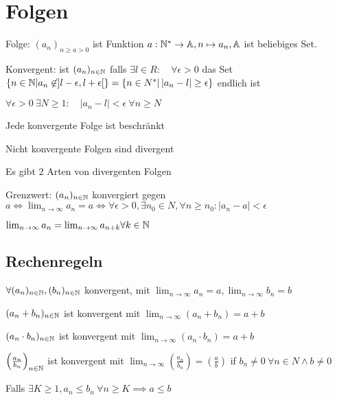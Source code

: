 
\section{Folgen}

\begin{compactdesc}
    \item[Folge:] $\left( a_n \right)_{n \ge a  > 0}$ ist Funktion $a:\mathbb{N}^* \to \mathbb{A}, n \mapsto a_n, \mathbb{A}$ ist beliebiges Set.
    \item[Konvergent:] ist $(a_n)_{n \in \mathbb{N}}$ falls $\exists l \in R: \quad \forall \epsilon > 0$ das Set $\left\{ n \in \mathbb{N} | a_n \not\in  ] l - \epsilon, l + \epsilon[ \right\} = \left\{ n \in N^* | \left| a_n - l \right| \ge \epsilon  \right\} $ endlich ist
        \begin{compactitem}
            \item $\forall  \epsilon > 0 \ \exists  N \ge 1: \quad |a_n - l| < \epsilon \ \forall n \ge N$
            \item Jede konvergente Folge ist beschränkt
            \item Nicht konvergente Folgen sind divergent
            \item Es gibt $2$ Arten von divergenten Folgen
        \end{compactitem}
    \item[Grenzwert:] $(a_n)_{n \in \mathbb{N}}$ konvergiert gegen $a \iff \lim_{n \to \infty} a_n = a \iff \forall \epsilon > 0, \exists n_0 \in N, \forall n \ge n_0: \left| a_n - a \right| < \epsilon$
        \begin{compactitem}
            \item $\lim_{n \to \infty} a_n = \lim_{n \to \infty} a_{n+k} \forall k \in \mathbb{N} $
        \end{compactitem}
\end{compactdesc}

\subsection{Rechenregeln}
$\forall (a_n)_{n \in \mathbb{N}}, (b_n)_{n \in \mathbb{N}}$ konvergent, mit $\lim_{n \to \infty} a_n = a, \lim_{n \to \infty} b_n = b$
\begin{compactenum}
    \item $(a_n + b_n)_{n \in \mathbb{N}}$ ist konvergent mit $\lim_{n \to \infty} (a_n + b_n) = a + b$
    \item $(a_n \cdot  b_n)_{n \in \mathbb{N}}$ ist konvergent mit $\lim_{n \to \infty} (a_n \cdot  b_n) = a + b$
    \item $\left( \frac{a_n}{b_n} \right) _{n \in \mathbb{N}}$ ist konvergent mit $\lim_{n \to \infty} \left( \frac{a_n}{b_n} \right) = \left( \frac{a}{b} \right)$ if $b_n \neq 0 \ \forall n \in N \wedge  b \neq 0$
    \item Falls $\exists K \ge 1, a_n \le  b_n \ \forall n \ge K \implies a \le b$
\end{compactenum}


